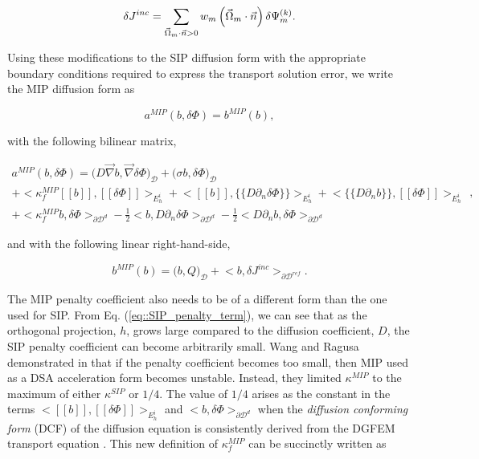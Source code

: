 \begin{equation}
\label{eq::MIP_inc_curr_error}
\delta J^{inc} = \sum\displaylimits_{\vec{\Omega}_m \cdot \vec{n} > 0} w_m \left(\vec{\Omega}_m \cdot \vec{n} \right) \delta \Psi_m^{(k)}.
\end{equation}

 \noindent Using these modifications to the SIP diffusion form with the appropriate boundary conditions required to express the transport solution error, we write the MIP diffusion form as

\begin{equation}
a^{MIP}( b, \delta \Phi) = b^{MIP}(b),
\label{eq::MIP_weak_form}
\end{equation}

\noindent with the following bilinear matrix,

\begin{equation}
\label{eq::MIP_bilinear_form}
\begin{aligned}
a^{MIP}(b, \delta \Phi)  = \Big(  D \vec{\nabla} b , \vec{\nabla} \delta \Phi  \Big)_{\mathcal{D}} + \Big(  \sigma b , \delta \Phi  \Big)_{\mathcal{D}}    \\
+  \Big< \kappa_f^{MIP} [\![   b ]\!] , [\![  \delta \Phi ]\!]\Big>_{E_h^i} + \Big<  [\![  b ]\!] , \{\!\{  D \partial_n \delta \Phi \}\!\}\Big>_{E_h^i}  + \Big< \{\!\{  D \partial_n b \}\!\} , [\![ \delta \Phi ]\!]\Big>_{E_h^i} \\
+ \Big< \kappa_f^{MIP}  b , \delta  \Phi \Big>_{\partial \mathcal{D}^d} - \frac{1}{2} \Big<  b ,  D \partial_n \delta \Phi \Big>_{\partial \mathcal{D}^d} - \frac{1}{2} \Big<   D \partial_n b , \delta \Phi \Big>_{\partial \mathcal{D}^d}  
\end{aligned} ,
\end{equation}

\noindent and with the following linear right-hand-side,

\begin{equation}
\label{eq::MIP_linear_form}
b^{MIP} (b) = \Big(  b, Q  \Big)_{\mathcal{D}}  + \Big< b, \delta  J^{inc}  \Big>_{\partial \mathcal{D}^{ref}} .
\end{equation}

\noindent The MIP penalty coefficient also needs to be of a different form than the one used for SIP. From Eq. (\ref{eq::SIP_penalty_term}), we can see that as the orthogonal projection, $h$, grows large compared to the diffusion coefficient, $D$, the SIP penalty coefficient can become arbitrarily small. Wang and Ragusa demonstrated in \cite{ragusa2010two} that if the penalty coefficient becomes too small, then MIP used as a DSA acceleration form becomes unstable. Instead, they limited $\kappa^{MIP}$ to the maximum of either $\kappa^{SIP}$ or $1/4$. The value of $1/4$ arises as the constant in the terms $\Big<  [\![   b ]\!] , [\![  \delta \Phi ]\!]\Big>_{E_h^i} $ and $\Big<  b , \delta  \Phi \Big>_{\partial \mathcal{D}^d}$ when the {\em diffusion conforming form} (DCF) of the diffusion equation is consistently derived from the DGFEM transport equation \cite{ref::DSA_wang_ragusa}. This new definition of $\kappa_f^{MIP}$ can be succinctly written as

